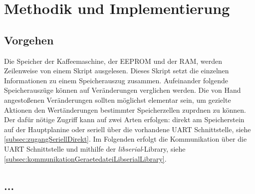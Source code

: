 \chapter{Methodik und Implementierung}

\section{Vorgehen}
Die Speicher der Kaffeemaschine, der \ac{EEPROM} und der \ac{RAM}, werden Zeilenweise von einem Skript ausgelesen. Dieses Skript setzt die einzelnen Informationen zu einem Speicherauszug zusammen. Aufeinander folgende Speicherauszüge können auf Veränderungen verglichen werden. Die von Hand angestoßenen Veränderungen sollten möglichst elementar sein, um gezielte Aktionen den Wertänderungen bestimmter Speicherzellen zuprdnen zu können.
Der dafür nötige Zugriff kann auf zwei Arten erfolgen: direkt am Speicherstein auf der Hauptplanine oder seriell über die vorhandene \ac{UART} Schnittstelle, siehe \ref{subsec:zugangSeriellDirekt}. Im Folgenden erfolgt die Kommunikation über die \ac{UART} Schnittstelle und mithilfe der \textit{libserial}-Library, siehe \ref{subsec:kommunikationGeraetedateiLibserialLibrary}.

\section{...}
